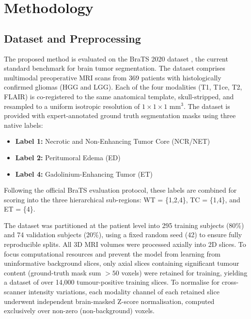 \documentclass[conference]{IEEEtran}
\begin{document}
\section{Methodology}
\label{sec:method}

\subsection{Dataset and Preprocessing}
The proposed method is evaluated on the BraTS 2020 dataset \cite{bakas2018identifying}, the current standard benchmark for brain tumor segmentation. The dataset comprises multimodal preoperative MRI scans from 369 patients with histologically confirmed gliomas (HGG and LGG). Each of the four modalities (T1, T1ce, T2, FLAIR) is co-registered to the same anatomical template, skull-stripped, and resampled to a uniform isotropic resolution of $1 \times 1 \times 1$ mm$^3$. The dataset is provided with expert-annotated ground truth segmentation masks using three native labels:
\begin{itemize}
    \item \textbf{Label 1:} Necrotic and Non-Enhancing Tumor Core (NCR/NET)
    \item \textbf{Label 2:} Peritumoral Edema (ED)
    \item \textbf{Label 4:} Gadolinium-Enhancing Tumor (ET)
\end{itemize}

Following the official BraTS evaluation protocol, these labels are combined for scoring into the three hierarchical sub-regions: WT = \{1,2,4\}, TC = \{1,4\}, and ET = \{4\}.

The dataset was partitioned at the patient level into 295 training subjects (80\%) and 74 validation subjects (20\%), using a fixed random seed (42) to ensure fully reproducible splits. All 3D MRI volumes were processed axially into 2D slices. To focus computational resources and prevent the model from learning from uninformative background slices, only axial slices containing significant tumour content (ground-truth mask sum $> 50$ voxels) were retained for training, yielding a dataset of over 14,000 tumour-positive training slices. To normalise for cross-scanner intensity variations, each modality channel of each retained slice underwent independent brain-masked Z-score normalisation, computed exclusively over non-zero (non-background) voxels.
\end{document}
